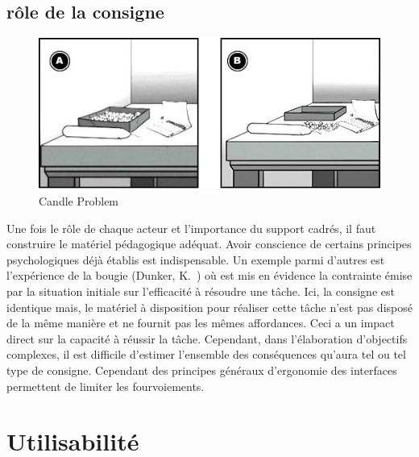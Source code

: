     \subsection{rôle de la consigne}
        \begin{figure}[!h]
              \centering
              \label{fig:Candle_Problem}\includegraphics[width=\linewidth]{Figures/Dunckers-candle_problem.png}
              \caption{Candle Problem~}
        \end{figure}\par%
        Une fois le rôle de chaque acteur et l'importance du support cadrés, il faut construire le matériel pédagogique adéquat. Avoir conscience de certains principes psychologiques déjà établis est indispensable. Un exemple parmi d'autres est l'expérience de la bougie (Dunker, K.~) où est mis en évidence la contrainte émise par la situation initiale sur l'efficacité à résoudre une tâche. Ici, la consigne est identique  mais, le matériel à disposition pour réaliser cette tâche n'est pas disposé de la même manière et ne fournit pas les mêmes affordances. Ceci a un impact direct sur la capacité à réussir la tâche.
        Cependant, dans l'élaboration d'objectifs complexes, il est difficile d'estimer l'ensemble des conséquences qu'aura tel ou tel type de consigne. Cependant des principes généraux d'ergonomie des interfaces permettent de limiter les fourvoiements.
\section{Utilisabilité}\label{sec:utilisabilite}
